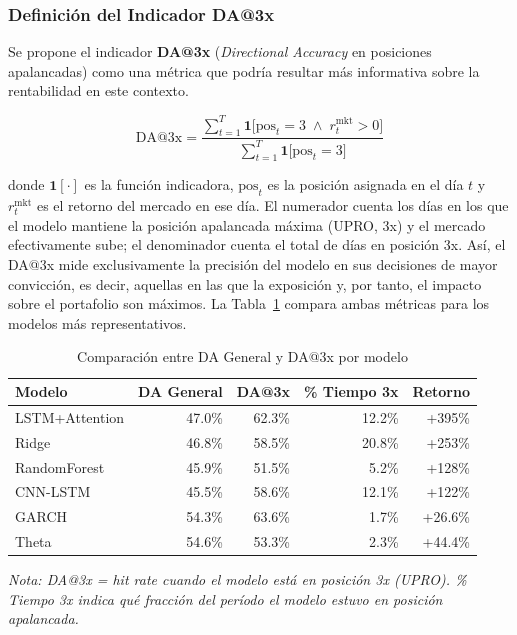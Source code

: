 \subsubsection{Definici\'on del Indicador DA@3x}
\label{subsec:da_3x}

Se propone el indicador \textbf{DA@3x} (\textit{Directional Accuracy} en posiciones apalancadas) como una m\'etrica que podr\'ia resultar m\'as informativa sobre la rentabilidad en este contexto.

\begin{equation}
\text{DA@3x} = \frac{\displaystyle\sum_{t=1}^{T} \mathbf{1}\bigl[\text{pos}_t = 3 \;\wedge\; r_t^{\text{mkt}} > 0\bigr]}{\displaystyle\sum_{t=1}^{T} \mathbf{1}\bigl[\text{pos}_t = 3\bigr]}
\end{equation}

donde $\mathbf{1}[\cdot]$ es la funci\'on indicadora, $\text{pos}_t$ es la posici\'on asignada en el d\'ia $t$ y $r_t^{\text{mkt}}$ es el retorno del mercado en ese d\'ia. El numerador cuenta los d\'ias en los que el modelo mantiene la posici\'on apalancada m\'axima (UPRO, 3x) y el mercado efectivamente sube; el denominador cuenta el total de d\'ias en posici\'on 3x. As\'i, el DA@3x mide exclusivamente la precisi\'on del modelo en sus decisiones de mayor convicci\'on, es decir, aquellas en las que la exposici\'on y, por tanto, el impacto sobre el portafolio son m\'aximos. La Tabla~\ref{tab:da_vs_da3x} compara ambas m\'etricas para los modelos m\'as representativos.

\begin{table}[htbp]
\centering
\caption{Comparaci\'on entre DA General y DA@3x por modelo}
\label{tab:da_vs_da3x}
\begin{tabular}{@{}lrrrr@{}}
\toprule
\textbf{Modelo} & \textbf{DA General} & \textbf{DA@3x} & \textbf{\% Tiempo 3x} & \textbf{Retorno} \\
\midrule
LSTM+Attention & 47.0\% & 62.3\% & 12.2\% & +395\% \\
Ridge & 46.8\% & 58.5\% & 20.8\% & +253\% \\
RandomForest & 45.9\% & 51.5\% & 5.2\% & +128\% \\
CNN-LSTM & 45.5\% & 58.6\% & 12.1\% & +122\% \\
\midrule
GARCH & 54.3\% & 63.6\% & 1.7\% & +26.6\% \\
Theta & 54.6\% & 53.3\% & 2.3\% & +44.4\% \\
\bottomrule
\end{tabular}

\vspace{0.2cm}
\parbox{0.9\textwidth}{\footnotesize\textit{Nota: DA@3x = hit rate cuando el modelo est\'a en posici\'on 3x (UPRO). \% Tiempo 3x indica qu\'e fracci\'on del per\'iodo el modelo estuvo en posici\'on apalancada.}}
\end{table}

